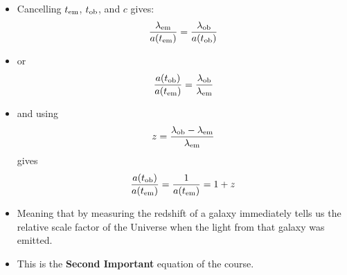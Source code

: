 \documentclass[11pt]{article}
\begin{document}
\begin{itemize}
\item Cancelling $t_{\rm em}$, $t_{\rm ob}$, and $c$ gives:  
\begin{equation}
    \frac{\lambda_{\rm em}}{a(t_{\rm em})} = \frac{\lambda_{\rm ob}}{a(t_{\rm ob})}
\end{equation}
\item or
\begin{equation}
    \frac{a(t_{\rm ob})}{a(t_{\rm em})} = \frac{\lambda_{\rm ob}}{\lambda_{\rm em}}
\end{equation}
\item and using 
\begin{equation}
    z = \frac{\lambda_{\rm ob}-\lambda_{\rm em}}{\lambda_{\rm em}}
\end{equation}
gives
\begin{equation}
    \frac{a(t_{\rm ob})}{a(t_{\rm em})} = \frac{1}{a(t_{\rm em})} = 1+z
\end{equation}
\item Meaning that by measuring the redshift of a galaxy immediately tells us the relative scale factor of the Universe when the light from that galaxy was emitted.
\item This is the {\bf Second Important} equation of the course.
\end{itemize}
\end{document}

